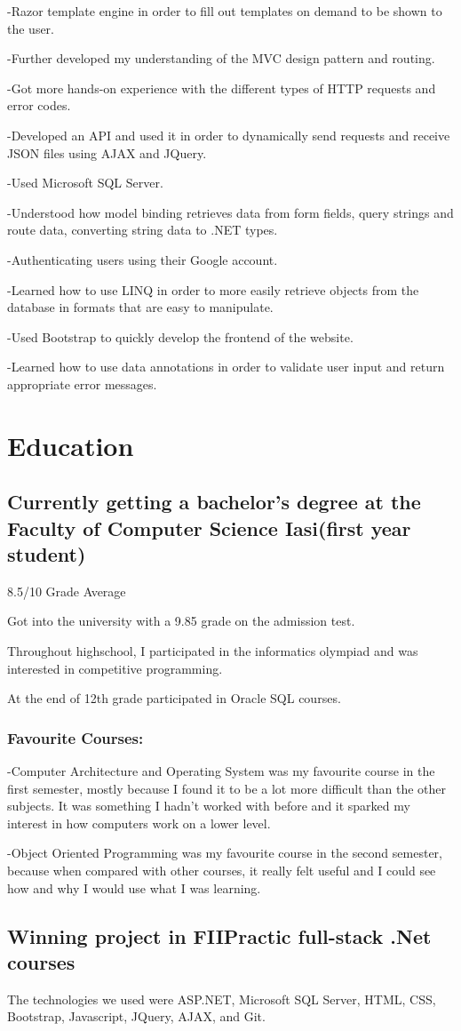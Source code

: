 \documentclass[a4paper,hidelinks,11pt]{article}
\begin{document}
-Razor template engine in order to fill out templates on demand to be shown to the user.

-Further developed my understanding of the MVC design pattern and routing.

-Got more hands-on experience with the different types of HTTP requests and error codes.

-Developed an API and used it in order to dynamically send requests and receive JSON files using AJAX and JQuery.

-Used Microsoft SQL Server.  

-Understood how model binding retrieves data from form fields, query strings and route data, converting string
data to .NET types.

-Authenticating users using their Google account.

-Learned how to use LINQ in order to more easily retrieve objects from the database in formats that are easy
to manipulate.

-Used Bootstrap to quickly develop the frontend of the website.

-Learned how to use data annotations in order to validate user input and return appropriate error messages.


\section{Education}
\subsection{Currently getting a bachelor's degree at 
the Faculty of Computer Science Iasi(first year student)}
 8.5/10 Grade Average

Got into the university with a 9.85 grade on the admission test.

Throughout highschool, I participated in the informatics olympiad and was interested in competitive programming.

At the end of 12th grade participated in Oracle SQL courses.
 
 \subsubsection{Favourite Courses:} 
 -Computer Architecture and Operating System was my favourite course in the first semester, mostly because I 
 found it to be a lot more difficult than the other subjects. It was something I hadn't worked with before
 and it sparked my interest in how computers work on a lower level.

 -Object Oriented Programming was my favourite course in the second semester, because when compared
 with other courses, it really felt useful and I could see how and why I would use what I was learning.


\subsection{Winning project in FIIPractic full-stack .Net courses}

The technologies we used were ASP.NET, Microsoft SQL Server, HTML, CSS, Bootstrap, Javascript,
JQuery, AJAX, and Git. 
\end{document}

